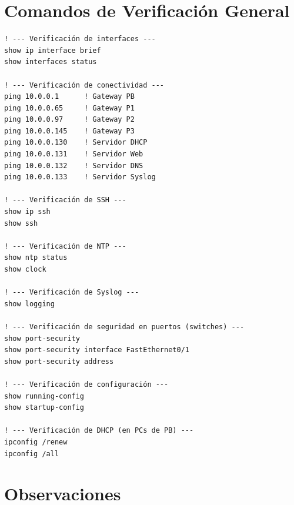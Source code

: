 \documentclass[letterpaper,11pt]{article}
\begin{document}
\section{Comandos de Verificación General}

\begin{lstlisting}[style=cisco, caption={Comandos de verificación para routers y switches}]
! --- Verificación de interfaces ---
show ip interface brief
show interfaces status

! --- Verificación de conectividad ---
ping 10.0.0.1      ! Gateway PB
ping 10.0.0.65     ! Gateway P1
ping 10.0.0.97     ! Gateway P2
ping 10.0.0.145    ! Gateway P3
ping 10.0.0.130    ! Servidor DHCP
ping 10.0.0.131    ! Servidor Web
ping 10.0.0.132    ! Servidor DNS
ping 10.0.0.133    ! Servidor Syslog

! --- Verificación de SSH ---
show ip ssh
show ssh

! --- Verificación de NTP ---
show ntp status
show clock

! --- Verificación de Syslog ---
show logging

! --- Verificación de seguridad en puertos (switches) ---
show port-security
show port-security interface FastEthernet0/1
show port-security address

! --- Verificación de configuración ---
show running-config
show startup-config

! --- Verificación de DHCP (en PCs de PB) ---
ipconfig /renew
ipconfig /all
\end{lstlisting}

\section{Observaciones}
\end{document}
